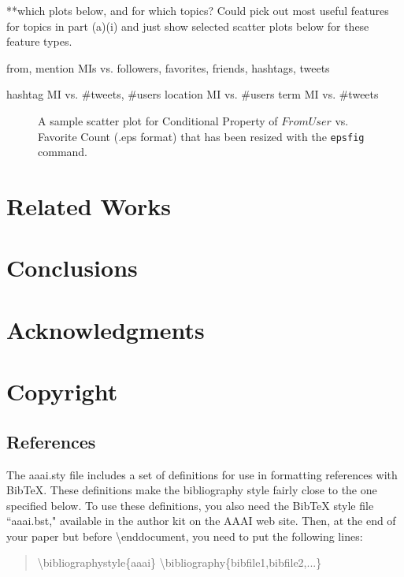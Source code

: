 \documentclass[letterpaper]{article}
\begin{document}
\begin{itemize}
\begin{enumerate}
**which plots below, and for which topics?  Could pick out most useful features for topics in part (a)(i) and just show selected scatter plots below for these feature types.

from, mention MIs vs. {followers, favorites, friends, hashtags, tweets}

hashtag MI vs. {\#tweets, \#users}
location MI vs. {\#users}
term MI vs. {\#tweets}

\begin{figure}[h]
\centering
{}
\caption{A sample scatter plot for Conditional Property of $FromUser$ vs. Favorite Count (.eps format)
that has been resized with the \texttt{epsfig} command.}
\end{figure}

\end{enumerate}

\end{itemize}

\section{Related Works}


\section{Conclusions}


\section{Acknowledgments}
\cite{cuiZhang}

\section{Copyright}

\subsection{References} 
The aaai.sty file includes a set of definitions for use in formatting references with BibTeX. These definitions make the bibliography style fairly close to the one specified below. To use these definitions, you also need the BibTeX style file ``aaai.bst," available in the author kit on the AAAI web site. Then, at the end of your paper but before \textbackslash end{document}, you need to put the following lines:

\begin{quote}
\begin{small}
\textbackslash bibliographystyle\{aaai\}
\textbackslash bibliography\{bibfile1,bibfile2,...\}
\end{small}
\end{quote}
\end{document}
